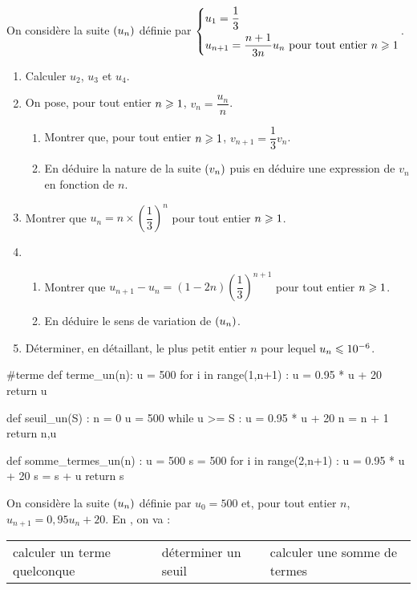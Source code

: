 \documentclass[a4paper,11pt]{article}
\begin{document}
On considère la suite $\suiten$ définie par $\begin{dcases} u_1 = \dfrac{1}{3} \\ u_{n+1} = \dfrac{n+1}{3n}u_n \text{ pour tout entier } n \pg 1 \end{dcases}$.
\begin{enumerate}
	\item Calculer $u_2$, $u_3$ et $u_4$.
	\item On pose, pour tout entier $n \pg 1$, $v_n = \dfrac{u_n}{n}$.
	\begin{enumerate}
		\item Montrer que, pour tout entier $n \pg 1$, $v_{n+1}=\dfrac{1}{3}v_n$.
		\item En déduire la nature de la suite $\suiten[v]$ puis en déduire une expression de $v_n$ en fonction de $n$.
	\end{enumerate}
	\item Montrer que $u_n= n \times \left( \dfrac13\right)^n$ pour tout entier $n \pg 1$.
	\item 
	\begin{enumerate}
		\item Montrer que $u_{n+1}-u_n = (1-2n) \left( \dfrac13\right)^{n+1}$ pour tout entier $n \pg 1$.
		\item En déduire le sens de variation de $\suiten$.
	\end{enumerate}
	\item Déterminer, en détaillant, le plus petit entier $n$ pour lequel $u_n \pp 10^{-6}$.
\end{enumerate}

\pagebreak


\smallskip

\begin{pyconcode}
#terme
def terme_un(n):
	u = 500
	for i in range(1,n+1) :
		u = 0.95 * u + 20
	return u
	
	
def seuil_un(S) :
	n = 0
	u = 500
	while u >= S :
		u = 0.95 * u + 20
		n = n + 1
	return n,u
	
	
def somme_termes_un(n) :
	u = 500
	s = 500
	for i in range(2,n+1) :
		u = 0.95 * u + 20
		s = s + u
	return s
	
	
\end{pyconcode}

\begin{cexemple}
{\small On considère la suite $\suiten$ définie par $u_0=500$ et, pour tout entier $n$, $u_{n+1}=0,95u_n+20$. En \calgpython, on va : \vspace{-6pt}
\begin{center}
	\setlength\arrayrulewidth{1pt} 
	\begin{tabularx}{\linewidth}{YYY}
		{\scriptsize\faPython} calculer un terme quelconque & {\scriptsize\faPython} déterminer un seuil & {\scriptsize\faPython} calculer une somme de termes \\
	\end{tabularx}
\end{center}}
\end{cexemple}
\end{document}
